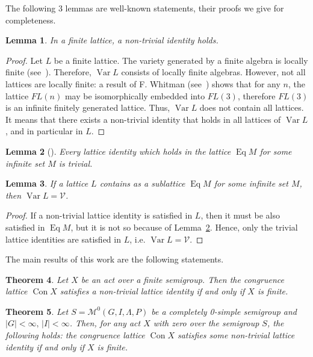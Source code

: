 \documentclass{birkau}
\numberwithin{equation}{section}
\theoremstyle{plain}
\newtheorem{theorem}{Theorem}[section]
\newtheorem{lemma}[theorem]{Lemma}
\theoremstyle{definition}
\DeclareMathOperator{\Con}{Con}
\DeclareMathOperator{\Eq}{Eq}
\DeclareMathOperator{\Var}{Var}
\begin{document}
	The following 3 lemmas are well-known statements, their proofs we give for completeness.
	
	\begin{lemma} \label{lb0}
	    In a finite lattice, a non-trivial identity holds.
	\end{lemma}
	\begin{proof}
	    Let $L$ be a finite lattice. The variety generated by a finite algebra is locally finite (see~\cite[Corollary 3.14]{kon}). Therefore, $\Var L$ consists of locally finite algebras. However, not all lattices are locally finite: a result of F. Whitman (see~\cite[Theorem 1.28]{free_lattices}) shows that for any $n$, the lattice $FL(n)$ may be isomorphically embedded into $FL(3)$, therefore $FL(3)$ is an infinite finitely generated lattice. Thus, $\Var L$ does not contain all lattices. It means that there exists a non-trivial identity that holds in all lattices of $\Var L$, and in particular in $L$.
	\end{proof}
	
	\begin{lemma}[\cite{sachs}] \label{lemma:b1}
	    Every lattice identity which holds in the lattice $\Eq M$ for some infinite set $M$ is trivial.
	\end{lemma}
	
	\begin{lemma} \label{la1}
	    If a lattice $L$ contains as a sublattice $\Eq M$ for some infinite set $M$, then $\Var L = \mathcal{V}$.
	\end{lemma}
	\begin{proof}
	    If a non-trivial lattice identity is satisfied in $L$, then it must be also satisfied in $\Eq M$, but it is not so because of Lemma~\ref{lemma:b1}. Hence, only the trivial lattice identities are satisfied in $L$, i.e. $\Var L = \mathcal{V}$.
	\end{proof}

	The main results of this work are the following statements.
	
	\begin{theorem} \label{t01}
	    Let $X$ be an act over a finite semigroup. Then the congruence lattice $\Con X$ satisfies a non-trivial lattice identity if and only if $X$ is finite.
	\end{theorem}
	
	\begin{theorem} \label{t02}
	    Let $S = \mathcal{M}^0(G,I,\Lambda,P)$ be a completely 0-simple semigroup and $|G| < \infty,\, |I| < \infty $. Then, for any act $X$ with zero over the semigroup $S$, the following holds: the congruence lattice $\Con X$ satisfies some non-trivial lattice identity if and only if $X$ is finite.
	\end{theorem}
	
\end{document}

